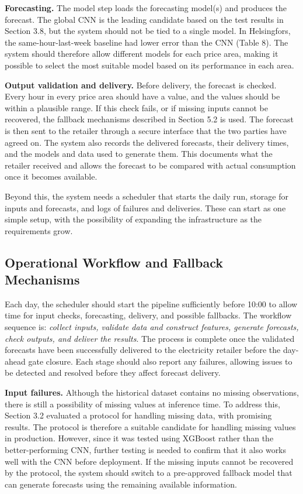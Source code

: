 \documentclass[11pt,a4paper]{article}
\begin{document}
\textbf{Forecasting.} The model step loads the forecasting model(s) and produces the forecast. The global CNN is the leading candidate based on the test results in Section 3.8, but the system should not be tied to a single model. In Helsingfors, the same-hour-last-week baseline had lower error than the CNN (Table 8). The system should therefore allow different models for each price area, making it possible to select the most suitable model based on its performance in each area.

\textbf{Output validation and delivery.} Before delivery, the forecast is checked. Every hour in every price area should have a value, and the values should be within a plausible range. If this check fails, or if missing inputs cannot be recovered, the fallback mechanisms described in Section 5.2 is used. The forecast is then sent to the retailer through a secure interface that the two parties have agreed on. The system also records the delivered forecasts, their delivery times, and the models and data used to generate them. This documents what the retailer received and allows the forecast to be compared with actual consumption once it becomes available.

Beyond this, the system needs a scheduler that starts the daily run, storage for inputs and forecasts, and logs of failures and deliveries. These can start as one simple setup, with the possibility of expanding the infrastructure as the requirements grow.

\subsection{Operational Workflow and Fallback Mechanisms}
Each day, the scheduler should start the pipeline sufficiently before 10:00 to allow time for input checks, forecasting, delivery, and possible fallbacks. The workflow sequence is: \textit{collect inputs, validate data and construct features, generate forecasts, check outputs, and deliver the results}. The process is complete once the validated forecasts have been successfully delivered to the electricity retailer before the day-ahead gate closure. Each stage should also report any failures, allowing issues to be detected and resolved before they affect forecast delivery.

\textbf{Input failures.} Although the historical dataset contains no missing observations, there is still a possibility of missing values at inference time. To address this, Section 3.2 evaluated a protocol for handling missing data, with promising results. The protocol is therefore a suitable candidate for handling missing values in production. However, since it was tested using XGBoost rather than the better-performing CNN, further testing is needed to confirm that it also works well with the CNN before deployment. If the missing inputs cannot be recovered by the protocol, the system should switch to a pre-approved fallback model that can generate forecasts using the remaining available information.
\end{document}

